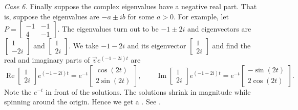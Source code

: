 \medskip

\emph{Case 6.} Finally suppose the complex eigenvalues have a negative real
part.  That is, suppose the eigenvalues are $-a \pm ib$ for some $a > 0$.
For example, let $P = 
\left[ \begin{smallmatrix} -1 & -1 \\ 4 & -1 \end{smallmatrix} \right]$.
The eigenvalues turn out to be $-1\pm 2i$ and eigenvectors are
$\left[ \begin{smallmatrix} 1 \\ -2i \end{smallmatrix} \right]$ and
$\left[ \begin{smallmatrix} 1 \\ 2i \end{smallmatrix} \right]$.  We take
$-1 - 2i$ and its eigenvector
$\left[ \begin{smallmatrix} 1 \\ 2i \end{smallmatrix} \right]$ and find
the real and imaginary parts of
$\vec{v} e^{(-1-2i)t}$ are
\begin{equation*}
\operatorname{Re}
\begin{bmatrix} 1 \\ 2i \end{bmatrix} e^{(-1-2i)t} =
e^{-t}
\begin{bmatrix} \cos (2t) \\ 2 \sin (2t)  \end{bmatrix} ,
\qquad
\operatorname{Im}
\begin{bmatrix} 1 \\ 2i \end{bmatrix} e^{(-1-2i)t} =
e^{-t}
\begin{bmatrix} -\sin (2t) \\ 2 \cos (2t) \end{bmatrix} .
\end{equation*}
Note the $e^{-t}$ in front of the solutions.  The solutions
shrink in magnitude while spinning around the origin.  Hence we get
a \emph{}.
See .

\begin{myfig}
\capstart
{}
\caption{Example spiral sink vector field.\label{pln:spiral-sinkfig}}
\end{myfig}

